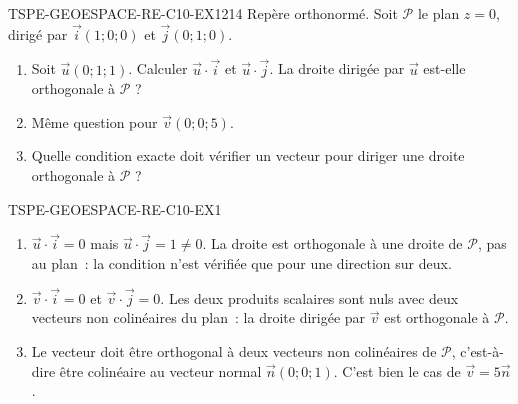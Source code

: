 
\begin{exercice}{TSPE-GEOESPACE-RE-C10-EX1}{2}{14}
Repère orthonormé. Soit $\mathcal{P}$ le plan $z=0$, dirigé par
$\vec{i}(1;0;0)$ et $\vec{j}(0;1;0)$.
\begin{enumerate}
  \item Soit $\vec{u}(0;1;1)$. Calculer $\vec{u}\cdot\vec{i}$ et
        $\vec{u}\cdot\vec{j}$. La droite dirigée par $\vec{u}$ est-elle
        orthogonale à $\mathcal{P}$ ?
  \item Même question pour $\vec{v}(0;0;5)$.
  \item Quelle condition exacte doit vérifier un vecteur pour diriger une
        droite orthogonale à $\mathcal{P}$ ?
\end{enumerate}
\end{exercice}


\begin{corrige}{TSPE-GEOESPACE-RE-C10-EX1}
\begin{enumerate}
  \item $\vec{u}\cdot\vec{i}=0$ mais $\vec{u}\cdot\vec{j}=1\neq0$. La droite
        est orthogonale à une droite de $\mathcal{P}$, pas au plan~: la
        condition n'est vérifiée que pour une direction sur deux.
  \item $\vec{v}\cdot\vec{i}=0$ et $\vec{v}\cdot\vec{j}=0$. Les deux produits
        scalaires sont nuls avec deux vecteurs non colinéaires du plan~: la
        droite dirigée par $\vec{v}$ est orthogonale à $\mathcal{P}$.
  \item Le vecteur doit être orthogonal à deux vecteurs non colinéaires de
        $\mathcal{P}$, c'est-à-dire être colinéaire au vecteur normal
        $\vec{n}(0;0;1)$. C'est bien le cas de $\vec{v}=5\vec{n}$.
\end{enumerate}
\end{corrige}
